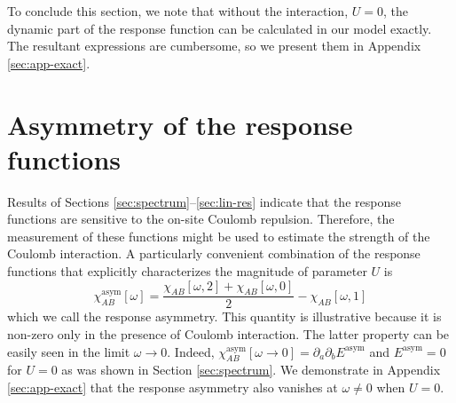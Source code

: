 \documentclass[aps,reprint,longbibliography, prb]{revtex4-2}
\begin{document}
To conclude this section, we note that without the interaction, $U = 0$, the dynamic part of the response function can be calculated in our model exactly. The resultant expressions are cumbersome, so we present them in Appendix \ref{sec:app-exact}.

\section{Asymmetry of the response functions}
\label{sec:asym}
Results of Sections \ref{sec:spectrum}--\ref{sec:lin-res} indicate that the response functions are sensitive to the on-site Coulomb repulsion. Therefore, the measurement of these functions might be used to estimate the strength of the Coulomb interaction. A particularly convenient combination of the response functions that explicitly characterizes the magnitude of parameter $U$ is
\begin{equation}
\label{eq:chi-asym}
 \chi_{AB}^{\mathrm{asym}}[\omega] = \frac{\chi_{AB}[\omega,2]+\chi_{AB}[\omega,0]}{2} - \chi_{AB}[\omega,1]
\end{equation}
which we call the response asymmetry. This quantity is illustrative because it is non-zero only in the presence of Coulomb interaction.
The latter property can be easily seen in the limit $\omega \rightarrow 0$. Indeed, $\chi^\mathrm{asym}_{AB}[\omega \rightarrow 0]=\partial_a \partial_b E^\mathrm{asym}$ and $E^\mathrm{asym} = 0$ for $U = 0$ as was shown in Section \ref{sec:spectrum}. We demonstrate in Appendix \ref{sec:app-exact} that the response asymmetry also vanishes at $\omega \neq 0$ when $U = 0$.
\end{document}
